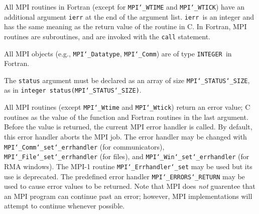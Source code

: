 All MPI routines in Fortran (except for {\tt MPI{\tt \char`\_}WTIME} and {\tt MPI{\tt \char`\_}WTICK}) have
an additional argument {\tt ierr} at the end of the argument list.  {\tt ierr
}is an integer and has the same meaning as the return value of the routine
in C.  In Fortran, MPI routines are subroutines, and are invoked with the
{\tt call} statement.
\par
All MPI objects (e.g., {\tt MPI{\tt \char`\_}Datatype}, {\tt MPI{\tt \char`\_}Comm}) are of type {\tt INTEGER
}in Fortran.
\par
The {\tt status} argument must be declared as an array of size {\tt MPI{\tt \char`\_}STATUS{\tt \char`\_}SIZE},
as in {\tt integer status(MPI{\tt \char`\_}STATUS{\tt \char`\_}SIZE)}.
\par
{}
\par
All MPI routines (except {\tt MPI{\tt \char`\_}Wtime} and {\tt MPI{\tt \char`\_}Wtick}) return an error value;
C routines as the value of the function and Fortran routines in the last
argument.  Before the value is returned, the current MPI error handler is
called.  By default, this error handler aborts the MPI job.  The error handler
may be changed with {\tt MPI{\tt \char`\_}Comm{\tt \char`\_}set{\tt \char`\_}errhandler} (for communicators),
{\tt MPI{\tt \char`\_}File{\tt \char`\_}set{\tt \char`\_}errhandler} (for files), and {\tt MPI{\tt \char`\_}Win{\tt \char`\_}set{\tt \char`\_}errhandler} (for
RMA windows).  The MPI-1 routine {\tt MPI{\tt \char`\_}Errhandler{\tt \char`\_}set} may be used but
its use is deprecated.  The predefined error handler
{\tt MPI{\tt \char`\_}ERRORS{\tt \char`\_}RETURN} may be used to cause error values to be returned.
Note that MPI does {\em not} guarentee that an MPI program can continue past
an error; however, MPI implementations will attempt to continue whenever
possible.
\par
{}
\endmanpage
